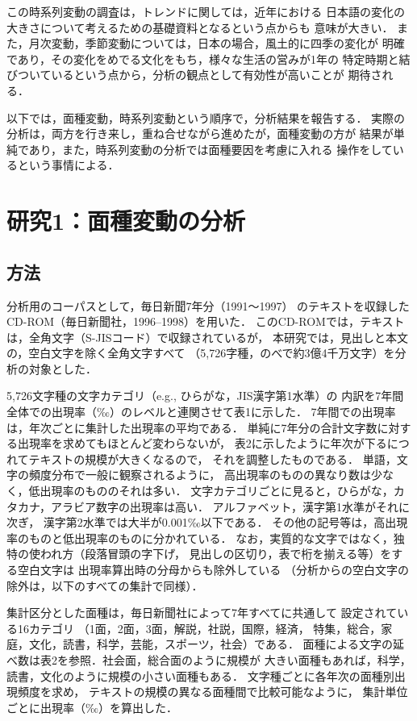  この時系列変動の調査は，トレンドに関しては，近年における
日本語の変化の大きさについて考えるための基礎資料となるという点からも
意味が大きい．
また，月次変動，季節変動については，日本の場合，風土的に四季の変化が
明確であり，その変化をめでる文化をもち，様々な生活の営みが1年の
特定時期と結びついているという点から，分析の観点として有効性が高いことが
期待される．

  以下では，面種変動，時系列変動という順序で，分析結果を報告する．
実際の分析は，両方を行き来し，重ね合せながら進めたが，面種変動の方が
結果が単純であり，また，時系列変動の分析では面種要因を考慮に入れる
操作をしているという事情による．


\section{研究1：面種変動の分析}

\subsection{方法}

  分析用のコーパスとして，毎日新聞7年分（1991〜1997）
のテキストを収録したCD-ROM（毎日新聞社，1996--1998）を用いた．
このCD-ROMでは，テキストは，全角文字（S-JISコード）で収録されているが，
本研究では，見出しと本文の，空白文字を除く全角文字すべて
（5,726字種，のべで約3億4千万文字）を分析の対象とした．

  5,726文字種の文字カテゴリ（e.g., ひらがな，JIS漢字第1水準）の
内訳を7年間全体での出現率（‰）のレベルと連関させて表1に示した．
7年間での出現率は，年次ごとに集計した出現率の平均である．
単純に7年分の合計文字数に対する出現率を求めてもほとんど変わらないが，
表2に示したように年次が下るにつれてテキストの規模が大きくなるので，
それを調整したものである．
単語，文字の頻度分布で一般に観察されるように，
高出現率のものの異なり数は少なく，低出現率のもののそれは多い．
文字カテゴリごとに見ると，ひらがな，カタカナ，アラビア数字の出現率は高い．
アルファベット，漢字第1水準がそれに次ぎ，
漢字第2水準では大半が0.001‰以下である．
その他の記号等は，高出現率のものと低出現率のものに分かれている．
なお，実質的な文字ではなく，独特の使われ方（段落冒頭の字下げ，
見出しの区切り，表で桁を揃える等）をする空白文字は
出現率算出時の分母からも除外している
（分析からの空白文字の除外は，以下のすべての集計で同様）．



  集計区分とした面種は，毎日新聞社によって7年すべてに共通して
設定されている16カテゴリ
（1面，2面，3面，解説，社説，国際，経済，
特集，総合，家庭，文化，読書，科学，芸能，スポーツ，社会）である．
面種による文字の延べ数は表2を参照．社会面，総合面のように規模が
大きい面種もあれば，科学，読書，文化のように規模の小さい面種もある．
文字種ごとに各年次の面種別出現頻度を求め，
テキストの規模の異なる面種間で比較可能なように，
集計単位ごとに出現率（‰）を算出した．

